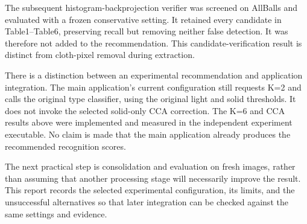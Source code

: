 The subsequent histogram-backprojection verifier was screened on AllBalls
and evaluated with a frozen conservative setting. It retained every candidate
in Table1--Table6, preserving recall but removing neither false detection.
It was therefore not added to the recommendation. This candidate-verification
result is distinct from cloth-pixel removal during extraction.

There is a distinction between an experimental recommendation and application
integration. The main application's current configuration still requests
K=2 and calls the original type classifier, using the original light and
solid thresholds. It does not invoke the selected solid-only CCA correction.
The K=6 and CCA results above were implemented and measured in the independent
experiment executable. No claim is made that the main application already
produces the recommended recognition scores.

The next practical step is consolidation and evaluation on fresh images,
rather than assuming that another processing stage will necessarily improve
the result. This report records the selected experimental configuration,
its limits, and the unsuccessful alternatives so that later integration
can be checked against the same settings and evidence.
